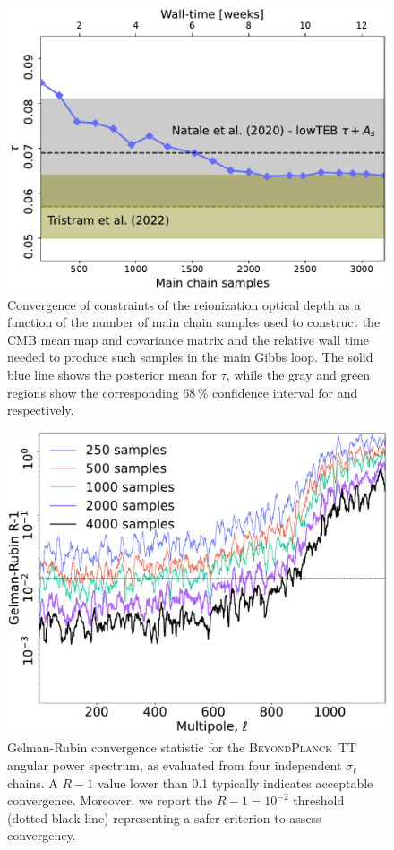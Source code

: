 \documentclass[twocolumn]{aa}
\newcommand{\BP}{\textsc{BeyondPlanck}}
\begin{document}
\begin{figure}[t]
  \center
  \includegraphics[width=\linewidth]{figs/BP10_lowl_tau_R18_Tbp10_burnin200s_regP05.pdf}
  \caption{Convergence of constraints of the reionization optical depth as 
    a function of the number of main chain samples used to
    construct the CMB mean map and covariance matrix and the relative wall time needed
    to produce such samples in the main Gibbs loop. 
    The solid blue line shows the posterior mean for $\tau$, while the gray and green 
    regions show the corresponding 68\,\% confidence interval for \citet{natale:2020} and \citet{tristram:2021} respectively.}
    \label{fig:convergence}
\end{figure}

\begin{figure}[t]
  \center
  \includegraphics[width=\linewidth]{figs/sigmal_GR.pdf}
  \caption{Gelman-Rubin convergence statistic for the \BP\ $\mathrm{TT}$
    angular power spectrum, as evaluated from four independent
    $\sigma_{\ell}$ chains. A $R-1$ value lower than 0.1 
    typically indicates
    acceptable convergence. Moreover, we report the $R-1=10^{-2}$ 
    threshold (dotted black line)
    representing a safer criterion to assess convergency.}
    \label{fig:gr_TT}
\end{figure}
\end{document}
